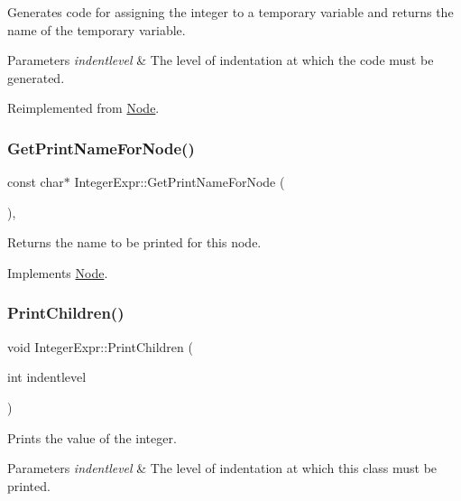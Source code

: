 Generates code for assigning the integer to a temporary variable and returns the name of the temporary variable. 
\begin{DoxyParams}{Parameters}
{\em indentlevel} & The level of indentation at which the code must be generated. \\
\hline
\end{DoxyParams}


Reimplemented from \hyperlink{class_node_acb60e526730e8436056375a3055c2c32}{Node}.

\mbox{\label{class_integer_expr_a76e0e8357539e515ddac3192ab595fc8}} 
\subsubsection{\texorpdfstring{Get\+Print\+Name\+For\+Node()}{GetPrintNameForNode()}}
{\footnotesize\ttfamily const char$\ast$ Integer\+Expr\+::\+Get\+Print\+Name\+For\+Node (\begin{DoxyParamCaption}{ }\end{DoxyParamCaption})\hspace{0.3cm}{\ttfamily [inline]}, {\ttfamily [virtual]}}

Returns the name to be printed for this node. 

Implements \hyperlink{class_node_a56e29657306ffb004d69c6929ae44269}{Node}.

\mbox{\label{class_integer_expr_ae8dfeab6ece069ed29c80a5614548268}} 
\subsubsection{\texorpdfstring{Print\+Children()}{PrintChildren()}}
{\footnotesize\ttfamily void Integer\+Expr\+::\+Print\+Children (\begin{DoxyParamCaption}\item[{int}]{indentlevel }\end{DoxyParamCaption})\hspace{0.3cm}{\ttfamily [virtual]}}

Prints the value of the integer. 
\begin{DoxyParams}{Parameters}
{\em indentlevel} & The level of indentation at which this class must be printed. \\
\hline
\end{DoxyParams}


